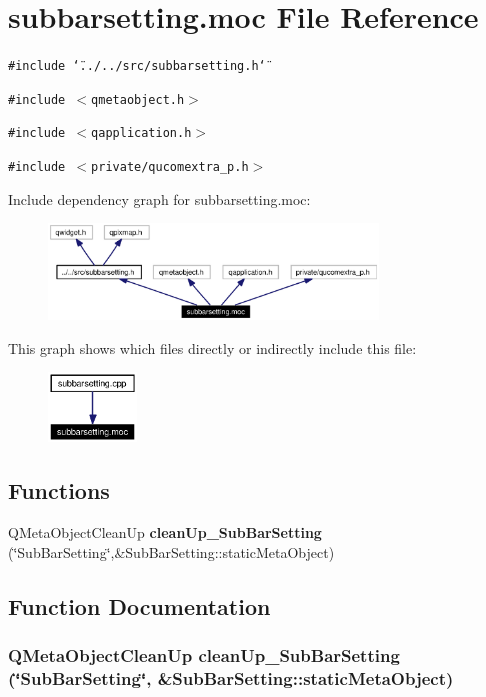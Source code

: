 \section{subbarsetting.moc File Reference}
\label{subbarsetting_8moc}


{\tt \#include \char`\"{}../../src/subbarsetting.h\char`\"{}}\par
{\tt \#include $<$qmetaobject.h$>$}\par
{\tt \#include $<$qapplication.h$>$}\par
{\tt \#include $<$private/qucomextra\_\-p.h$>$}\par


Include dependency graph for subbarsetting.moc:\begin{figure}[H]
\begin{center}
\leavevmode
\includegraphics[width=248pt]{subbarsetting_8moc__incl}
\end{center}
\end{figure}


This graph shows which files directly or indirectly include this file:\begin{figure}[H]
\begin{center}
\leavevmode
\includegraphics[width=67pt]{subbarsetting_8moc__dep__incl}
\end{center}
\end{figure}
\subsection*{Functions}
\begin{CompactItemize}
\item 
QMeta\-Object\-Clean\-Up {\bf clean\-Up\_\-Sub\-Bar\-Setting} (\char`\"{}Sub\-Bar\-Setting\char`\"{},\&Sub\-Bar\-Setting::static\-Meta\-Object)
\end{CompactItemize}


\subsection{Function Documentation}
\subsubsection{\setlength{\rightskip}{0pt plus 5cm}QMeta\-Object\-Clean\-Up clean\-Up\_\-Sub\-Bar\-Setting (\char`\"{}Sub\-Bar\-Setting\char`\"{}, \&Sub\-Bar\-Setting::static\-Meta\-Object)\hspace{0.3cm}{\tt  [static]}}\label{subbarsetting_8moc_a0}


